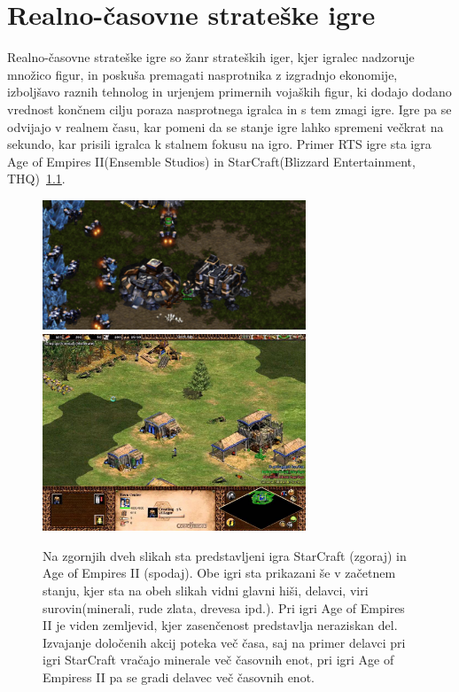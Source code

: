\documentclass[a4paper, 12pt]{book}
\begin{document}
\chapter{Realno-časovne strateške igre}
\label{chrts}

Realno-časovne strateške igre so žanr strateških iger, kjer igralec nadzoruje množico figur, in poskuša premagati nasprotnika z izgradnjo ekonomije, izboljšavo raznih tehnolog in urjenjem primernih vojaških figur, ki dodajo dodano vrednost končnem cilju poraza nasprotnega igralca in s tem zmagi igre.
Igre pa se odvijajo v realnem času, kar pomeni da se stanje igre lahko spremeni večkrat na sekundo, kar prisili igralca k stalnem fokusu na igro.
Primer RTS igre sta igra Age of Empires II(Ensemble Studios) in StarCraft(Blizzard Entertainment, THQ)~\ref{picRtsGames}. 

\begin{figure}[h]
	\begin{center}
		\includegraphics[width=0.7\textwidth]{photos/rts_sc1.pdf}
		\includegraphics[width=0.7\textwidth]{photos/rts_aoe2.pdf}
	\end{center}
	\caption{Na zgornjih dveh slikah sta predstavljeni igra StarCraft (zgoraj) in Age of Empires II (spodaj). Obe igri sta prikazani še v začetnem stanju, kjer sta na obeh slikah vidni glavni hiši, delavci, viri surovin(minerali, rude zlata, drevesa ipd.). Pri igri Age of Empires II je viden zemljevid, kjer zasenčenost predstavlja neraziskan del. Izvajanje določenih akcij poteka več časa, saj na primer delavci pri igri StarCraft vračajo minerale več časovnih enot, pri igri Age of Empiress II pa se gradi delavec več časovnih enot.}
	\label{picRtsGames}
\end{figure}
\end{document}
